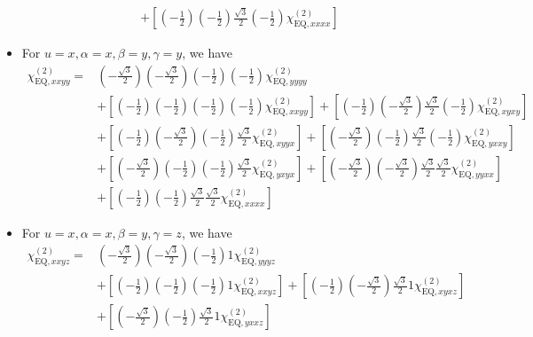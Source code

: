 \documentclass[UTF8,10pt,a4paper]{article}
\begin{document}
\begin{itemize}
\begin{align}
&+\left[\left(-\frac{1}{2}\right)\left(-\frac{1}{2}\right)\frac{\sqrt{3}}{2}\left(-\frac{1}{2}\right)\chi_{\text{EQ},xxxx}^{(2)}\right]
\end{align}\normalsize
\item For $u=x,\alpha=x,\beta=y,\gamma=y$, we have
\footnotesize\begin{align}
\nonumber\chi_{\text{EQ},xxyy}^{(2)}=&\left(-\frac{\sqrt{3}}{2}\right)\left(-\frac{\sqrt{3}}{2}\right)\left(-\frac{1}{2}\right)\left(-\frac{1}{2}\right)\chi_{\text{EQ},yyyy}^{(2)}\\
\nonumber&+\left[\left(-\frac{1}{2}\right)\left(-\frac{1}{2}\right)\left(-\frac{1}{2}\right)\left(-\frac{1}{2}\right)\chi_{\text{EQ},xxyy}^{(2)}\right]+\left[\left(-\frac{1}{2}\right)\left(-\frac{\sqrt{3}}{2}\right)\frac{\sqrt{3}}{2}\left(-\frac{1}{2}\right)\chi_{\text{EQ},xyxy}^{(2)}\right]\\
\nonumber&+\left[\left(-\frac{1}{2}\right)\left(-\frac{\sqrt{3}}{2}\right)\left(-\frac{1}{2}\right)\frac{\sqrt{3}}{2}\chi_{\text{EQ},xyyx}^{(2)}\right]+\left[\left(-\frac{\sqrt{3}}{2}\right)\left(-\frac{1}{2}\right)\frac{\sqrt{3}}{2}\left(-\frac{1}{2}\right)\chi_{\text{EQ},yxxy}^{(2)}\right]\\
\nonumber&+\left[\left(-\frac{\sqrt{3}}{2}\right)\left(-\frac{1}{2}\right)\left(-\frac{1}{2}\right)\frac{\sqrt{3}}{2}\chi_{\text{EQ},yxyx}^{(2)}\right]+\left[\left(-\frac{\sqrt{3}}{2}\right)\left(-\frac{\sqrt{3}}{2}\right)\frac{\sqrt{3}}{2}\frac{\sqrt{3}}{2}\chi_{\text{EQ},yyxx}^{(2)}\right]\\
&+\left[\left(-\frac{1}{2}\right)\left(-\frac{1}{2}\right)\frac{\sqrt{3}}{2}\frac{\sqrt{3}}{2}\chi_{\text{EQ},xxxx}^{(2)}\right]
\end{align}\normalsize
\item For $u=x,\alpha=x,\beta=y,\gamma=z$, we have
\footnotesize\begin{align}
\nonumber\chi_{\text{EQ},xxyz}^{(2)}=&\left(-\frac{\sqrt{3}}{2}\right)\left(-\frac{\sqrt{3}}{2}\right)\left(-\frac{1}{2}\right)1\chi_{\text{EQ},yyyz}^{(2)}\\
\nonumber&+\left[\left(-\frac{1}{2}\right)\left(-\frac{1}{2}\right)\left(-\frac{1}{2}\right)1\chi_{\text{EQ},xxyz}^{(2)}\right]+\left[\left(-\frac{1}{2}\right)\left(-\frac{\sqrt{3}}{2}\right)\frac{\sqrt{3}}{2}1\chi_{\text{EQ},xyxz}^{(2)}\right]\\
\nonumber&+\left[\left(-\frac{\sqrt{3}}{2}\right)\left(-\frac{1}{2}\right)\frac{\sqrt{3}}{2}1\chi_{\text{EQ},yxxz}^{(2)}\right]\\
\nonumber&\\

\end{align}
\end{itemize}
\end{document}
